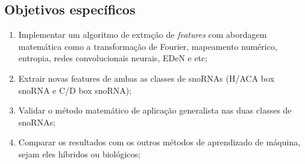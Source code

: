 \subsection{Objetivos específicos}

\begin{enumerate}
    \item Implementar um algoritmo de extração de \textit{features} com abordagem matemática como a transformação de Fourier, mapeamento numérico, entropia, redes convolucionais neurais, EDeN e etc;
    \item Extrair novas features de ambas as classes de snoRNAs (H/ACA box snoRNA e C/D box snoRNA);
    \item Validar o método matemático de aplicação generalista nas duas classes de snoRNAs;
    \item Comparar os resultados com os outros métodos de aprendizado de máquina, sejam eles híbridos ou biológicos;
\end{enumerate}